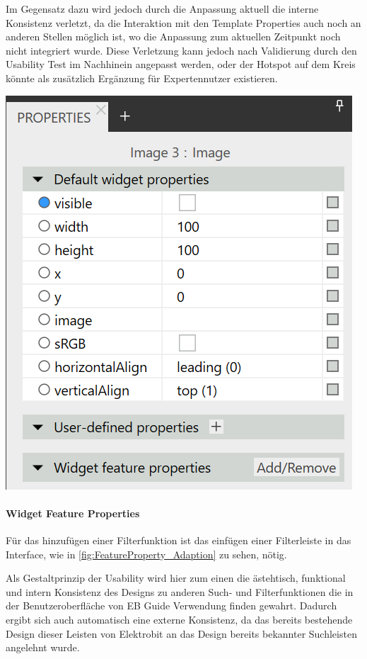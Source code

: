 Im Gegensatz dazu wird jedoch durch die Anpassung aktuell die interne Konsistenz verletzt, da die Interaktion mit den Template Properties auch noch an anderen Stellen möglich ist, wo die Anpassung zum aktuellen Zeitpunkt noch nicht integriert wurde.
Diese Verletzung kann jedoch nach Validierung durch den Usability Test im Nachhinein angepasst werden, oder der Hotspot auf dem Kreis könnte als zusätzlich Ergänzung für Expertennutzer existieren.

\begin{center}
  \includegraphics[scale=0.8]{figures/TemplateProperties_Adaption.png}
  \label{fig:TemplateProperties_Adaption}
\end{center}


\paragraph{Widget Feature Properties}
Für das hinzufügen einer Filterfunktion ist das einfügen einer Filterleiste in das Interface, wie in \cref{fig:FeatureProperty_Adaption} zu sehen, nötig.

Als Gestaltprinzip der Usability wird hier zum einen die  ästehtisch, funktional und intern Konsistenz des Designs zu anderen Such- und Filterfunktionen die in der Benutzeroberfläche von EB Guide Verwendung finden gewahrt.
Dadurch ergibt sich auch automatisch eine externe Konsistenz, da das bereits bestehende Design dieser Leisten von Elektrobit an das Design bereits bekannter Suchleisten angelehnt wurde.


